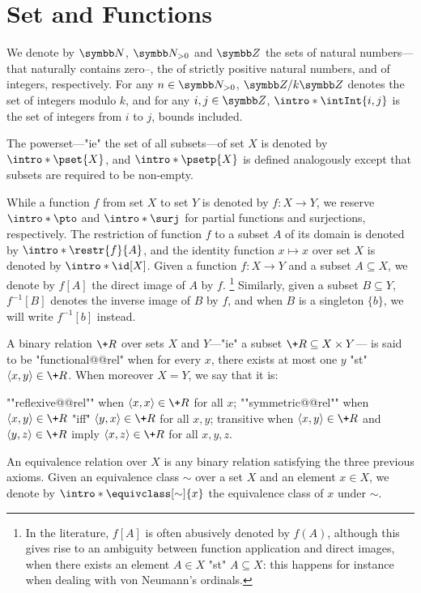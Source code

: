 \section{Set and Functions}

We denote by $\N$, $\Np$ and $\Z$ the sets of natural numbers---that naturally contains zero--, the
of strictly positive natural numbers, and of integers, respectively.
For any $n\in\Np$, $\ZnZ{k}$ denotes the set of integers modulo $k$,
and for any $i,j \in \Z$, $\intro*\intInt{i,j}$ is the set of integers from $i$ to $j$,
bounds included.

The powerset---"ie" the set of all subsets---of set $X$
is denoted by $\intro*\pset{X}$, and $\intro*\psetp{X}$ is defined analogously
except that subsets are required to be non-empty.

While a function $f$ from set $X$ to set $Y$ is denoted by $f\colon X \to Y$,
we reserve $\intro*\pto$ and $\intro*\surj$ for partial functions and surjections, respectively.
The restriction of function $f$ to a subset $A$ of its domain is denoted by
$\intro*\restr{f}{A}$, and the identity function $x \mapsto x$ over set $X$
is denoted by $\intro*\id[X]$.
Given a function $f\colon X \to Y$ and a subset $A \subseteq X$,
we denote by $f[A]$ the direct image of $A$ by $f$.%
\footnote{In the literature, $f[A]$ is often abusively denoted by $f(A)$, although
this gives rise to an ambiguity between function application and direct images,
when there exists an element $A \in X$ "st" $A \subseteq X$: this happens for instance
when dealing with von Neumann's ordinals.}
Similarly, given a subset $B \subseteq Y$, $f^{-1}[B]$ denotes
the inverse image of $B$ by $f$, and when $B$ is a singleton $\{b\}$,
we will write $f^{-1}[b]$ instead.%

A binary relation $\+R$ over sets $X$ and $Y$---"ie" a subset $\+R \subseteq X \times Y$---
is said to be "functional@@rel" when for every $x$, there exists at most one $y$
"st" $\tup{x,y} \in \+R$.
When moreover $X = Y$, we say that it is:
\begin{itemize}
	\itemAP ""reflexive@@rel"" when $\tup{x,x} \in \+R$ for all $x$;
	\itemAP ""symmetric@@rel"" when $\tup{x,y} \in \+R$ "iff" $\tup{y,x} \in \+R$
		for all $x,y$;
	\itemAP transitive when $\tup{x,y} \in \+R$ and $\tup{y,z} \in \+R$
		imply $\tup{x,z} \in \+R$
		for all $x,y,z$.
\end{itemize}
An equivalence relation over $X$ is any binary relation satisfying the three previous axioms.
Given an equivalence class $\sim$ over a set $X$ and an element $x \in X$,
we denote by $\intro*\equivclass[\sim]{x}$ the equivalence class of $x$ under $\sim$.

